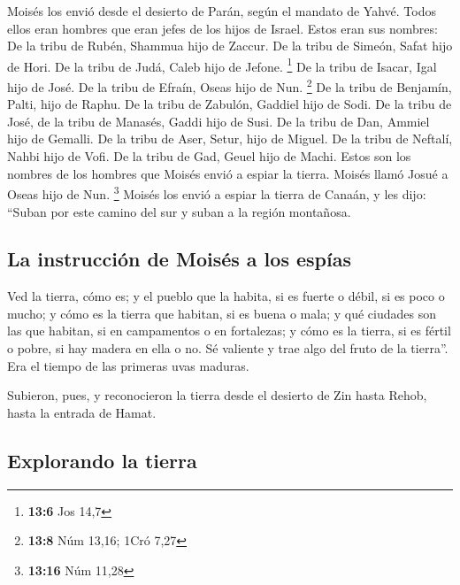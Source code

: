  Moisés los envió desde el desierto de Parán, según el
mandato de Yahvé. Todos ellos eran hombres que eran jefes de los hijos
de Israel.  Estos eran sus nombres: De la tribu de Rubén,
Shammua hijo de Zaccur.  De la tribu de Simeón, Safat hijo
de Hori.  De la tribu de Judá, Caleb hijo de Jefone.
\footnote{\textbf{13:6} Jos 14,7}  De la tribu de Isacar,
Igal hijo de José.  De la tribu de Efraín, Oseas hijo de
Nun. \footnote{\textbf{13:8} Núm 13,16; 1Cró 7,27}  De la
tribu de Benjamín, Palti, hijo de Raphu.  De la tribu de
Zabulón, Gaddiel hijo de Sodi.  De la tribu de José, de
la tribu de Manasés, Gaddi hijo de Susi.  De la tribu de
Dan, Ammiel hijo de Gemalli.  De la tribu de Aser, Setur,
hijo de Miguel.  De la tribu de Neftalí, Nahbi hijo de
Vofi.  De la tribu de Gad, Geuel hijo de Machi.
 Estos son los nombres de los hombres que Moisés envió a
espiar la tierra. Moisés llamó Josué a Oseas hijo de Nun. \footnote{\textbf{13:16}
  Núm 11,28}  Moisés los envió a espiar la tierra de
Canaán, y les dijo: ``Suban por este camino del sur y suban a la región
montañosa.

\hypertarget{la-instrucciuxf3n-de-moisuxe9s-a-los-espuxedas}{%
\subsection{La instrucción de Moisés a los
espías}\label{la-instrucciuxf3n-de-moisuxe9s-a-los-espuxedas}}

 Ved la tierra, cómo es; y el pueblo que la habita, si es
fuerte o débil, si es poco o mucho;  y cómo es la tierra
que habitan, si es buena o mala; y qué ciudades son las que habitan, si
en campamentos o en fortalezas;  y cómo es la tierra, si
es fértil o pobre, si hay madera en ella o no. Sé valiente y trae algo
del fruto de la tierra''. Era el tiempo de las primeras uvas maduras.

 Subieron, pues, y reconocieron la tierra desde el
desierto de Zin hasta Rehob, hasta la entrada de Hamat.

\hypertarget{explorando-la-tierra}{%
\subsection{Explorando la tierra}\label{explorando-la-tierra}}

